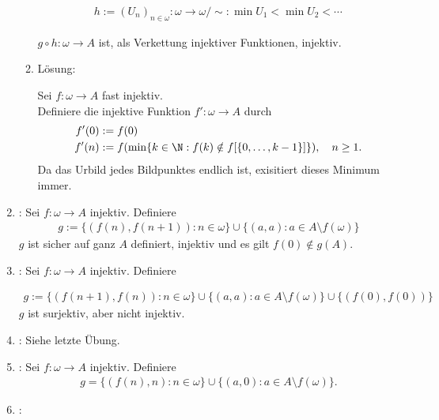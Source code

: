 \begin{solution}
\begin{enumerate}[label = \texttt{ad}]
\begin{enumerate}[label = \arabic*.]
    \begin{align*}
      h := (U_n)_{n \in \omega}:
      \omega \to \omega / \sim:
      \min U_1 < \min U_2 < \cdots
    \end{align*}

    $g \circ h: \omega \to A$ ist, als Verkettung injektiver Funktionen, injektiv.

    \item Lösung:

    Sei $f: \omega \to A$ fast injektiv. \\
    Definiere die injektive Funktion $f': \omega \to A$ durch
    \begin{align*}
      f'(0) &:= f(0) \\
      f'(n) &:= f(\min\{k \in  \N:  f(k) \notin f[\{0,\dots,k-1\}]\}), \quad n \geq 1.
    \end{align*}
    Da das Urbild jedes Bildpunktes endlich ist, exisitiert dieses Minimum immer.

  \end{enumerate}

  \item {}: Sei $f: \omega \to A$ injektiv.
  Definiere
  \begin{align*}
    g := \{(f(n),f(n+1)): n \in \omega\} \cup \{(a,a): a \in A \setminus f(\omega)\}
  \end{align*}
  $g$ ist sicher auf ganz $A$ definiert, injektiv und es gilt $f(0) \notin g(A)$.

  \item {}: Sei $f: \omega \to A$ injektiv. Definiere

  \begin{align*}
    g := \{(f(n+1),f(n)): n \in \omega\} \cup \{(a,a): a \in A \setminus f(\omega)\}
    \cup \{(f(0),f(0))\}
  \end{align*}
  $g$ ist surjektiv, aber nicht injektiv.

  \item {}: Siehe letzte Übung.

  \item {}: Sei $f: \omega \to A$ injektiv. Definiere
  \begin{align*}
    g = \{(f(n), n): n \in \omega\} \cup \{(a,0): a \in A \setminus f(\omega)\}.
  \end{align*}

  \item {}:


\end{enumerate}
\end{solution}
